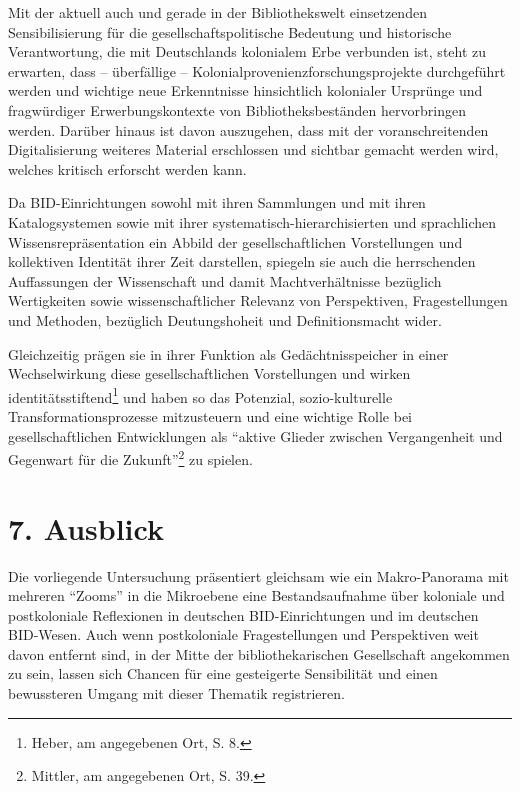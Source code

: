 \documentclass[a4paper,
fontsize=11pt,
oneside,
numbers=noperiodatend,
parskip=half-,
bibliography=totoc,
final
]{scrartcl}
\begin{document}
Mit der aktuell auch und gerade in der Bibliothekswelt einsetzenden
Sensibilisierung für die gesellschaftspolitische Bedeutung und
historische Verantwortung, die mit Deutschlands kolonialem Erbe
verbunden ist, steht zu erwarten, dass -- überfällige --
Kolonialprovenienzforschungsprojekte durchgeführt werden und wichtige
neue Erkenntnisse hinsichtlich kolonialer Ursprünge und fragwürdiger
Erwerbungskontexte von Bibliotheksbeständen hervorbringen werden.
Darüber hinaus ist davon auszugehen, dass mit der voranschreitenden
Digitalisierung weiteres Material erschlossen und sichtbar gemacht
werden wird, welches kritisch erforscht werden kann.

Da BID-Einrichtungen sowohl mit ihren Sammlungen und mit ihren
Katalogsystemen sowie mit ihrer systematisch-hierarchisierten und
sprachlichen Wissensrepräsentation ein Abbild der gesellschaftlichen
Vorstellungen und kollektiven Identität ihrer Zeit darstellen, spiegeln
sie auch die herrschenden Auffassungen der Wissenschaft und damit
Machtverhältnisse bezüglich Wertigkeiten sowie wissenschaftlicher
Relevanz von Perspektiven, Fragestellungen und Methoden, bezüglich
Deutungshoheit und Definitionsmacht wider.

Gleichzeitig prägen sie in ihrer Funktion als Gedächtnisspeicher in
einer Wechselwirkung diese gesellschaftlichen Vorstellungen und wirken
identitätsstiftend\footnote{Heber, am angegebenen Ort, S. 8.} und haben
so das Potenzial, sozio-kulturelle Transformationsprozesse mitzusteuern
und eine wichtige Rolle bei gesellschaftlichen Entwicklungen als
\enquote{aktive Glieder zwischen Vergangenheit und Gegenwart für die
Zukunft}\footnote{Mittler, am angegebenen Ort, S. 39.} zu spielen.

\hypertarget{ausblick}{%
\section{7. Ausblick}\label{ausblick}}

Die vorliegende Untersuchung präsentiert gleichsam wie ein
Makro-Panorama mit mehreren \enquote{Zooms} in die Mikroebene eine
Bestandsaufnahme über koloniale und postkoloniale Reflexionen in
deutschen BID-Einrichtungen und im deutschen BID-Wesen. Auch wenn
postkoloniale Fragestellungen und Perspektiven weit davon entfernt sind,
in der Mitte der bibliothekarischen Gesellschaft angekommen zu sein,
lassen sich Chancen für eine gesteigerte Sensibilität und einen
bewussteren Umgang mit dieser Thematik registrieren.
\end{document}
